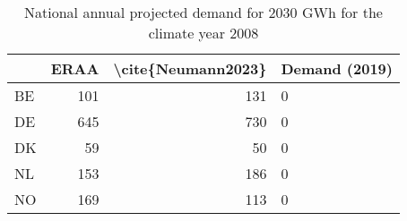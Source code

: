 \begin{table}
\centering
\caption{National annual projected demand for 2030  GWh for the climate year 2008}
\begin{tabular}{lrrl}
\toprule
{} &  ERAA &  \textbackslash cite\{Neumann2023\} & Demand (2019) \\
\midrule
BE &   101 &                 131 &             0 \\
DE &   645 &                 730 &             0 \\
DK &    59 &                  50 &             0 \\
NL &   153 &                 186 &             0 \\
NO &   169 &                 113 &             0 \\
\bottomrule
\end{tabular}
\end{table}

